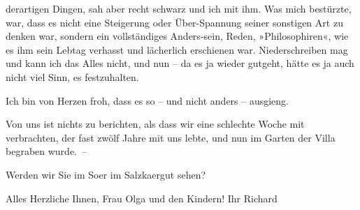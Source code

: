                derartigen Dingen, sah aber recht schwarz {\pb}und ich mit ihm. Was mich
               bestürzte, war, dass es nicht eine Steigerung oder Über-Spannung seiner sonstigen Art
               zu denken war, sondern ein vollständiges Anders-sein, Reden, »Philosophiren«, wie es
               ihm sein Lebtag verhasst und lächerlich erschienen war. Niederschreiben mag und kann
               ich das Alles nicht, und nun – da es ja wieder gutgeht, hätte es ja auch nicht viel
               Sinn, es festzuhalten.\pend
           
\pstart
           Ich bin von Herzen froh, dass es so – und nicht anders – ausgieng.\pend
           
\pstart
           Von uns ist nichts zu berichten, als dass wir eine schlechte Woche mit \label{K_L02266-1v}\label{K_L02266-1} verbrachten, der fast zwölf Jahre mit uns lebte, und nun im Garten der Villa
               begraben wurde. –\pend
           
\pstart
           Werden wir Sie im So{\geminationm}er im Salzka{\geminationm}ergut sehen?\pend
           
\pstart
           Alles Herzliche Ihnen, Frau Olga und den Kindern! Ihr\pend
           \pstart \spacefill\mbox{Richard}\pend{}\endnumbering{}  
      